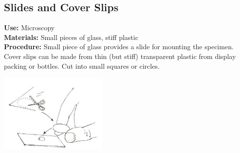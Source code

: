 \begin{multicols}{2}

\section{Slides and Cover Slips}
\label{sec:slide-cover-slip}
\vspace{-10pt}
\textbf{Use:} Microscopy\\
\textbf{Materials:} Small pieces of glass, stiff plastic\\
\textbf{Procedure:} Small piece of glass provides a slide for mounting the
specimen. Cover slips can be made
from thin (but stiff) transparent plastic from
display packing or bottles. Cut into small squares or circles.
\begin{center}
\includegraphics[width=0.4\textwidth]{./img/source/slide-cover-slip.jpg}
\end{center}



\end{multicols}
